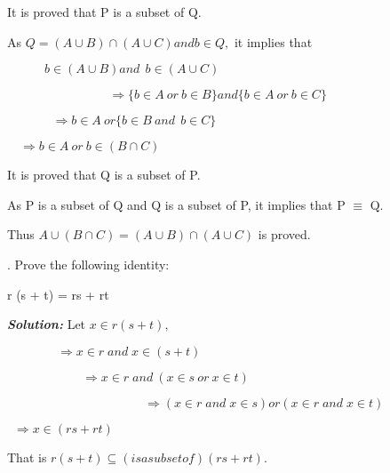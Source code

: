 \documentclass[10pt,a4paper]{article}
\begin{document}
It is proved that P is a subset of Q.

As $Q = (A \cup B) \cap (A \cup C) and b \in Q,$ it implies that
\begin{center}
$\quad \qquad  b \in (A \cup B) and\:\: b \in (A \cup C) $

$\quad\qquad \,\qquad\quad\qquad\Longrightarrow \{b \in A\: or\: b \in B\} and \{b \in A \: or\: b \in C\}$

$\quad\quad\:\quad\:\,\Longrightarrow b \in A\: or \{b \in B \:and \:\:b \in C\}$

$\quad\Longrightarrow b \in A \:or\: b \in (B \cap C)$
\end{center}

It is proved that Q is a subset of P.

As P is a subset of Q and Q is a subset of P, it implies that P $\equiv$ Q.

Thus $A \cup (B \cap C) = (A \cup B) \cap (A \cup C)$ is proved.

\begin{flushleft}
    . Prove the following identity:

  \qquad r (s + t) = rs + rt
\end{flushleft}

\textsl{\textbf{Solution:}} Let $x \in r(s + t),$

\begin{center}

  $\qquad\qquad\Longrightarrow x \in r \;and\; x \in (s + t)$
  
  $\qquad\qquad\quad\quad\Longrightarrow x \in r \;and\: (x \in s \:or\: x \in t)$
  
  $\qquad\qquad\qquad\qquad\qquad\quad\Longrightarrow (x \in r \;and\; x \in s) or (x \in r \;and\; x \in t)$
  
  $\:\;\Longrightarrow x \in (rs + rt)$
  
\end{center}

That is $r(s + t) \subseteq (is a subset of) (rs + rt)$.
\end{document}
